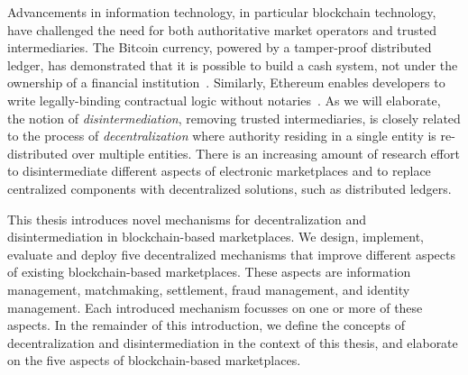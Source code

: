 Advancements in information technology, in particular blockchain technology, have challenged the need for both authoritative market operators and trusted intermediaries.
The Bitcoin currency, powered by a tamper-proof distributed ledger, has demonstrated that it is possible to build a cash system, not under the ownership of a financial institution~\cite{nakamoto2008bitcoin}.
Similarly, Ethereum enables developers to write legally-binding contractual logic without notaries~\cite{wood2014ethereum}.
As we will elaborate, the notion of \emph{disintermediation}, removing trusted intermediaries, is closely related to the process of \emph{decentralization} where authority residing in a single entity is re-distributed over multiple entities.
There is an increasing amount of research effort to disintermediate different aspects of electronic marketplaces and to replace centralized components with decentralized solutions, such as distributed ledgers.


This thesis introduces novel mechanisms for decentralization and disintermediation in blockchain-based marketplaces.
We design, implement, evaluate and deploy five decentralized mechanisms that improve different aspects of existing blockchain-based marketplaces.
These aspects are information management, matchmaking, settlement, fraud management, and identity management.
Each introduced mechanism focusses on one or more of these aspects.
In the remainder of this introduction, we define the concepts of decentralization and disintermediation in the context of this thesis, and elaborate on the five aspects of blockchain-based marketplaces.

